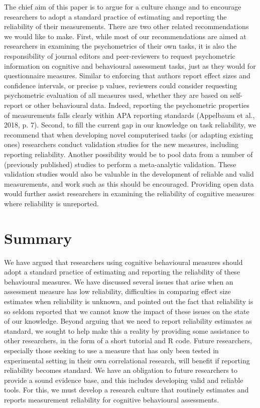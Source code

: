 \documentclass[english,,man,floatsintext]{apa6}
\begin{document}
The chief aim of this paper is to argue for a culture change and to encourage researchers to adopt a standard practice of estimating and reporting the reliability of their measurements. There are two other related recommendations we would like to make. First, while most of our recommendations are aimed at researchers in examining the psychometrics of their own tasks, it is also the responsibility of journal editors and peer-reviewers to request psychometric information on cognitive and behavioural assessment tasks, just as they would for questionnaire measures. Similar to enforcing that authors report effect sizes and confidence intervals, or precise p values, reviewers could consider requesting psychometric evaluation of all measures used, whether they are based on self-report or other behavioural data. Indeed, reporting the psychometric properties of measurements falls clearly within APA reporting standards (Appelbaum et al., 2018, p. 7). Second, to fill the current gap in our knowledge on task reliability, we recommend that when developing novel computerised tasks (or adapting existing ones) researchers conduct validation studies for the new measures, including reporting reliability. Another possibility would be to pool data from a number of (previously published) studies to perform a meta-analytic validation. These validation studies would also be valuable in the development of reliable and valid measurements, and work such as this should be encouraged. Providing open data would further assist researchers in examining the reliability of cognitive measures where reliability is unreported.

\hypertarget{summary}{%
\section{Summary}\label{summary}}

We have argued that researchers using cognitive behavioural measures should adopt a standard practice of estimating and reporting the reliability of these behavioural measures. We have discussed several issues that arise when an assessment measure has low reliability, difficulties in comparing effect size estimates when reliability is unknown, and pointed out the fact that reliability is so seldom reported that we cannot know the impact of these issues on the state of our knowledge. Beyond arguing that we need to report reliability estimates as standard, we sought to help make this a reality by providing some assistance to other researchers, in the form of a short tutorial and R code. Future researchers, especially those seeking to use a measure that has only been tested in experimental setting in their own correlational research, will benefit if reporting reliability becomes standard. We have an obligation to future researchers to provide a sound evidence base, and this includes developing valid and reliable tools. For this, we must develop a research culture that routinely estimates and reports measurement reliability for cognitive behavioural assessments.
\end{document}
